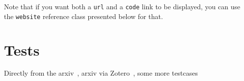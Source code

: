 \documentclass[a4paper,twocolumn,11pt]{quantumarticle}
\begin{document}
	Note that if you want both a \texttt{url} and a \texttt{code} link to be displayed, you can use the \texttt{website} reference class presented below for that.
	
	
	\section{Tests}
	Directly from the arxiv~, arxiv via Zotero~, some more testcases~
	
	
\end{document}
